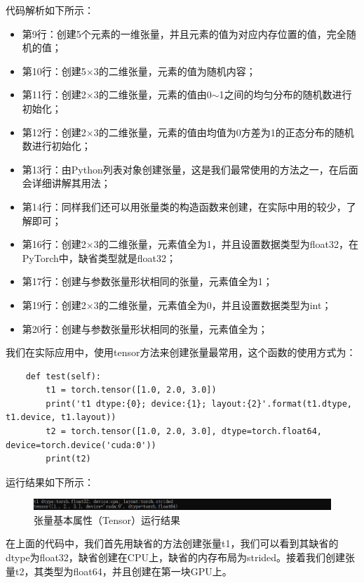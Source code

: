 \documentclass[UTF8]{article}
\begin{document}
代码解析如下所示：
\begin{itemize}
\item 第9行：创建5个元素的一维张量，并且元素的值为对应内存位置的值，完全随机的值；
\item 第10行：创建5$\times$3的二维张量，元素的值为随机内容；
\item 第11行：创建2$\times$3的二维张量，元素的值由0$\sim$1之间的均匀分布的随机数进行初始化；
\item 第12行：创建2$\times$3的二维张量，元素的值由均值为0方差为1的正态分布的随机数进行初始化；
\item 第13行：由Python列表对象创建张量，这是我们最常使用的方法之一，在后面会详细讲解其用法；
\item 第14行：同样我们还可以用张量类的构造函数来创建，在实际中用的较少，了解即可；
\item 第16行：创建2$\times$3的二维张量，元素值全为1，并且设置数据类型为float32，在PyTorch中，缺省类型就是float32；
\item 第17行：创建与参数张量形状相同的张量，元素值全为1；
\item 第19行：创建2$\times$3的二维张量，元素值全为0，并且设置数据类型为int；
\item 第20行：创建与参数张量形状相同的张量，元素值全为；
\end{itemize}
我们在实际应用中，使用tensor方法来创建张量最常用，这个函数的使用方式为：
\begin{lstlisting}
    def test(self):
        t1 = torch.tensor([1.0, 2.0, 3.0])
        print('t1 dtype:{0}; device:{1}; layout:{2}'.format(t1.dtype, t1.device, t1.layout))
        t2 = torch.tensor([1.0, 2.0, 3.0], dtype=torch.float64, device=torch.device('cuda:0'))
        print(t2)
\end{lstlisting}
运行结果如下所示：
\begin{figure}[H]
	\caption{张量基本属性（Tensor）运行结果}
	\label{f000002}
	\centering
	\includegraphics[width=15cm]{images/f000002}
\end{figure}
在上面的代码中，我们首先用缺省的方法创建张量t1，我们可以看到其缺省的dtype为float32，缺省创建在CPU上，缺省的内存布局为strided。接着我们创建张量t2，其类型为float64，并且创建在第一块GPU上。
\end{document}
